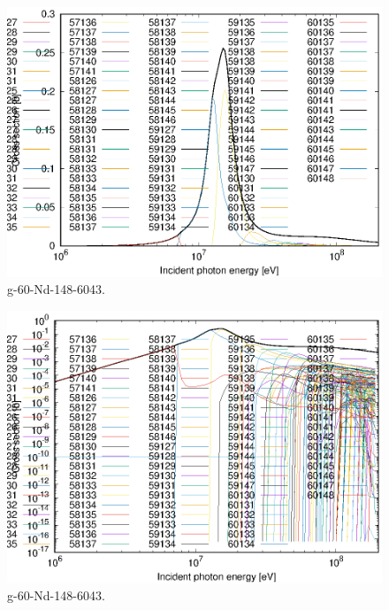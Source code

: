 \begin{figure}
 \includegraphics[width=\linewidth]{eps/g_60-Nd-148_6043.eps}
  \caption{g-60-Nd-148-6043.}
\end{figure}
\begin{figure}
 \includegraphics[width=\linewidth]{eps-log/g_60-Nd-148_6043.eps}
 \caption{g-60-Nd-148-6043.}
\end{figure}
\newpage \clearpage


